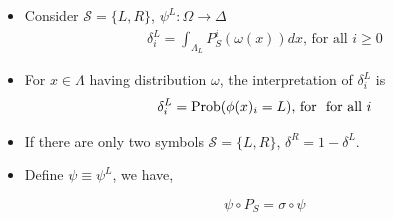 \documentclass[12pt,t]{beamer}
\begin{document}
\begin{frame}

\begin{itemize}\setlength{\parskip}{0pt}  \setlength{\itemsep}{5pt} \setlength{\topsep}{0pt}

    \item Consider $\mathcal{S} =\{L,R \}$, $\psi^L :\Omega \rightarrow \Delta$
               \begin{eqnarray}
               \label{psidef}
               \delta^L_i = \int_{\Lambda_L} P^i_S \left(\omega(x)\right)dx \text{, for all }i\ge0
               \end{eqnarray}
    \item For $x\in \Lambda$ having distribution $\omega$, the interpretation of $\delta_i^L$ is
             \begin{eqnarray}
             \label{deltaistar}
             \delta_i^L = \operatorname{Prob}(\phi(x)_i = L) \text{, for } \text{ for all }i
              \end{eqnarray}


    \item If there are only two symbols $\mathcal{S} =\{L,R\}$, $\delta^R=1-\delta^L$.
    \item  Define $\psi \equiv \psi^L$, we have,
           \begin{lemma}
                $$\psi \circ P_S = \sigma \circ \psi$$
           \end{lemma}

\end{itemize}



\end{frame}
\end{document}
